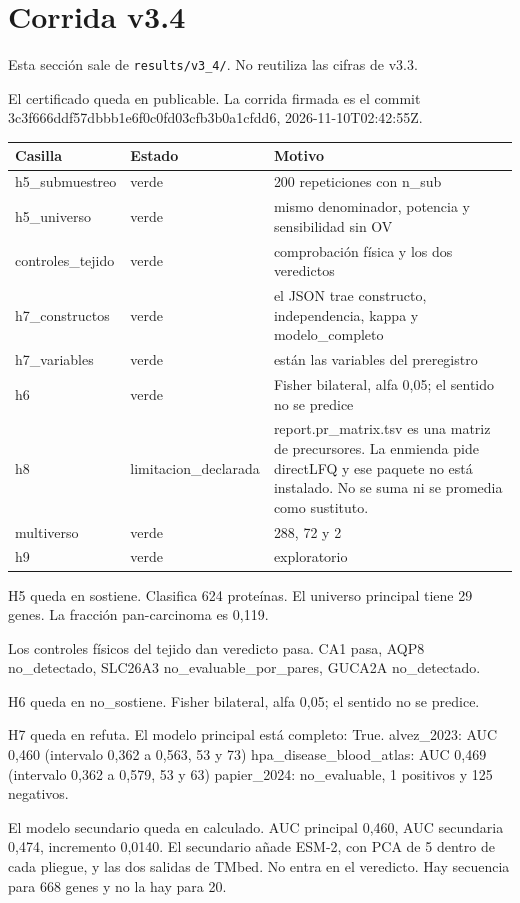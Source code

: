\section{Corrida v3.4}
Esta sección sale de \texttt{results/v3\_4/}. No reutiliza las cifras de v3.3.

El certificado queda en publicable. La corrida firmada es el commit 3c3f666ddf57dbbb1e6f0c0fd03cfb3b0a1cfdd6, 2026-11-10T02:42:55Z.

\begin{tabular}{lll}
\toprule
Casilla & Estado & Motivo \\
\midrule
h5\_submuestreo & verde & 200 repeticiones con n\_sub \\
h5\_universo & verde & mismo denominador, potencia y sensibilidad sin OV \\
controles\_tejido & verde & comprobación física y los dos veredictos \\
h7\_constructos & verde & el JSON trae constructo, independencia, kappa y modelo\_completo \\
h7\_variables & verde & están las variables del preregistro \\
h6 & verde & Fisher bilateral, alfa 0,05; el sentido no se predice \\
h8 & limitacion\_declarada & report.pr\_matrix.tsv es una matriz de precursores. La enmienda pide directLFQ y ese paquete no está instalado. No se suma ni se promedia como sustituto. \\
multiverso & verde & 288, 72 y 2 \\
h9 & verde & exploratorio \\
\bottomrule
\end{tabular}

H5 queda en sostiene. Clasifica 624 proteínas. El universo principal tiene 29 genes. La fracción pan-carcinoma es 0,119.

Los controles físicos del tejido dan veredicto pasa. CA1 pasa, AQP8 no\_detectado, SLC26A3 no\_evaluable\_por\_pares, GUCA2A no\_detectado.

H6 queda en no\_sostiene. Fisher bilateral, alfa 0,05; el sentido no se predice.

H7 queda en refuta. El modelo principal está completo: True. alvez\_2023: AUC 0,460 (intervalo 0,362 a 0,563, 53 y 73) hpa\_disease\_blood\_atlas: AUC 0,469 (intervalo 0,362 a 0,579, 53 y 63) papier\_2024: no\_evaluable, 1 positivos y 125 negativos.

El modelo secundario queda en calculado. AUC principal 0,460, AUC secundaria 0,474, incremento 0,0140. El secundario añade ESM-2, con PCA de 5 dentro de cada pliegue, y las dos salidas de TMbed. No entra en el veredicto. Hay secuencia para 668 genes y no la hay para 20.

